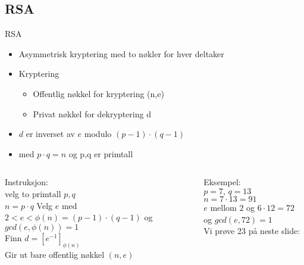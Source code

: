 \subsection*{RSA}
\begin{frame}{RSA}
\begin{itemize}[<+->]
\item Asymmetrisk kryptering med to nøkler for hver deltaker
\item Kryptering
	\begin{itemize}
	\item Offentlig nøkkel for kryptering (n,e)
	\item Privat nøkkel for dekryptering d
	\end{itemize}
 \item $d$ er inverset av $e$ modulo $(p-1)\cdot (q-1)$ 
 \item med $p\cdot q=n$ og p,q er primtall
\end{itemize}
\end{frame}

\begin{frame}{}
    \begin{columns}
        \begin{column}{0.45 \textwidth}
            Instruksjon:\\
            velg to primtall $p,q$\\
            $n=p\cdot q$
            Velg $e$ med $2<e<\phi(n)=(p-1)\cdot (q-1)$ og $gcd(e,\phi(n))=1$\\
            Finn $d=[e^{-1}]_{\phi(n)}$\\
            Gir ut bare offentlig nøkkel $(n,e)$
        \end{column}
        \begin{column}{0.45 \textwidth}
            Eksempel:\\
            $p=7,\,q=13$\\
            $n=7\cdot 13=91$\\
            $e$ mellom $2$ og $6\cdot 12=72$ og $gcd(e,72)=1$\\
            Vi prøve 23 på neste slide:
        \end{column}
    \end{columns}
\end{frame}

